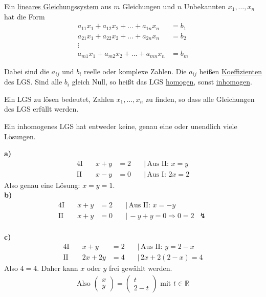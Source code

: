 Ein \underline{lineares Gleichungssystem} aus $m$ Gleichungen und $n$ Unbekannten $x_1,\dots,x_n$ hat die Form
\begin{align*}
    a_{11}x_1 + a_{12}x_2 + \dots + a_{1n}x_n &= b_1 \\
    a_{21}x_1 + a_{22}x_2 + \dots + a_{2n}x_n &= b_2 \\
    \vdots & \\
    a_{m1}x_1 + a_{m2}x_2 + \dots + a_{mn}x_n &= b_m
\end{align*}

Dabei sind die $a_{ij}$ und $b_i$ reelle oder komplexe Zahlen. Die $a_{ij}$ heißen \underline{Koeffizienten} des LGS. Sind alle $b_i$ gleich Null, so heißt das LGS \underline{homogen}, sonst \underline{inhomogen}.

Ein LGS zu lösen bedeutet, Zahlen $x_1,\dots,x_n$ zu finden, so dass alle Gleichungen des LGS erfüllt werden.

Ein inhomogenes LGS hat entweder keine, genau eine oder unendlich viele Lösungen.


\textbf{a)}
\begin{alignat*}{4}
\text{I}\quad & x+y & = 2 & \quad|\,\text{Aus II: } x = y \\
\text{II}\quad & x-y & = 0 & \quad|\,\text{Aus I: } 2x = 2
\end{alignat*}
Also genau eine Lösung: $x = y = 1$. \\

\textbf{b)}
\begin{alignat*}{4}
\text{I}\quad & x+y & = 2 & \quad|\,\text{Aus II: } x = -y \\
\text{II}\quad & x+y & = 0 & \quad|\,-y+y = 0 \Rightarrow 0 = 2 \enspace\lightning
\end{alignat*} \\

\textbf{c)}
\begin{alignat*}{4}
\text{I}\quad & x+y & = 2 & \quad|\,\text{Aus II: } y = 2 - x \\
\text{II}\quad & 2x + 2y & = 4 & \quad|\,2x + 2(2-x) = 4
\end{alignat*}
Also $4 = 4$. Daher kann $x$ oder $y$ frei gewählt werden.
\begin{align*}
    \text{Also }\begin{pmatrix}x\\y\end{pmatrix} = \begin{pmatrix}t\\2-t\end{pmatrix}\text{ mit }t\in \mathbb{R}
\end{align*}

